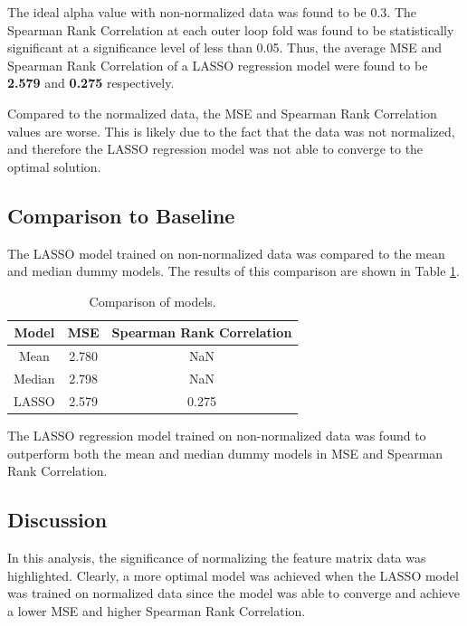 \documentclass[11pt]{article}
\begin{document}
\vspace{-0.5cm}

The ideal alpha value with non-normalized data was found to be 0.3. The Spearman Rank Correlation at each outer loop fold was found to be statistically significant at a significance level of less than 0.05. Thus, the average MSE and Spearman Rank Correlation of a LASSO regression model were found to be \textbf{2.579} and \textbf{0.275} respectively.

Compared to the normalized data, the MSE and Spearman Rank Correlation values are worse. This is likely due to the fact that the data was not normalized, and therefore the LASSO regression model was not able to converge to the optimal solution.

\subsection*{Comparison to Baseline}
The LASSO model trained on non-normalized data was compared to the mean and median dummy models. The results of this comparison are shown in Table \ref{tab:no_normal_regression_baseline}.

\begin{table}[H]
    \centering
    \begin{tabular}{|c|c|c|}
        \hline
        Model & MSE & Spearman Rank Correlation \\
        \hline
        Mean & 2.780 & NaN \\
        Median & 2.798 & NaN \\
        LASSO & 2.579 & 0.275 \\
        \hline
    \end{tabular}
    \caption{Comparison of models.}
    \label{tab:no_normal_regression_baseline}
\end{table}

\vspace{-0.5cm}

The LASSO regression model trained on non-normalized data was found to outperform both the mean and median dummy models in MSE and Spearman Rank Correlation.

\subsection*{Discussion}
In this analysis, the significance of normalizing the feature matrix data was highlighted. Clearly, a more optimal model was achieved when the LASSO model was trained on normalized data since the model was able to converge and achieve a lower MSE and higher Spearman Rank Correlation. 
\end{document}
